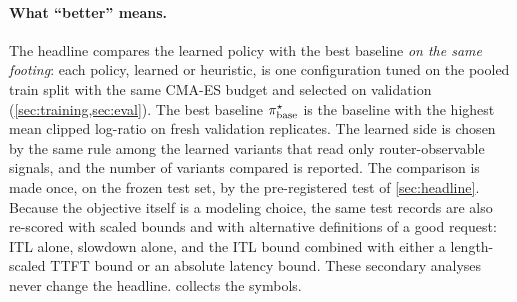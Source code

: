 \paragraph{What ``better'' means.}
The headline compares the learned policy with the best baseline \emph{on the same footing}: each
policy, learned or heuristic, is one configuration tuned on the pooled train split with the same
CMA-ES budget and selected on validation (\cref{sec:training,sec:eval}). The best baseline $\pi^{\star}_{\mathrm{base}}$
is the baseline with the highest mean clipped log-ratio on fresh validation replicates. The learned
side is chosen by the same rule among the learned variants that read only router-observable
signals, and the number of variants compared is reported. The comparison is made once, on the
frozen test set, by the pre-registered test of \cref{sec:headline}. Because the objective itself is
a modeling choice, the same test records are also re-scored with scaled bounds and with
alternative definitions of a good request: ITL alone, slowdown alone, and the ITL bound combined
with either a length-scaled TTFT bound or an absolute latency bound. These secondary analyses never
change the headline.  collects the symbols.
